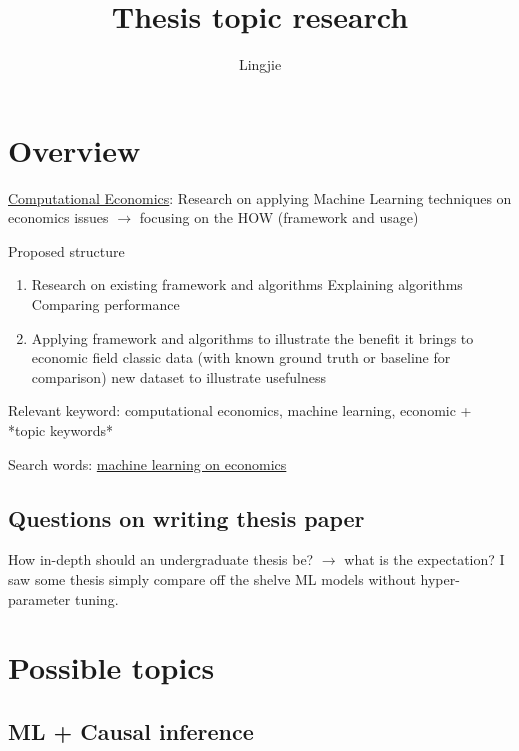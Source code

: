 \documentclass[11pt, oneside]{article}   	%
\title{Thesis topic research}
\author{Lingjie}
\begin{document}
\maketitle

\tableofcontents

\section{Overview}
    \href{https://www.springer.com/journal/10614}{Computational Economics}: 
    Research on applying Machine Learning techniques on economics issues 
    $\rightarrow$ focusing on the HOW (framework and usage)

    Proposed structure
    \begin{enumerate}
        \item Research on existing framework and algorithms
            \subitem[1.1] Explaining algorithms
            \subitem[1.2] Comparing performance
        \item Applying framework and algorithms to illustrate the benefit it brings to economic field
            \subitem[2.1] classic data (with known ground truth or baseline for comparison)
            \subitem[2.2] new dataset to illustrate usefulness
    \end{enumerate}

    Relevant keyword: computational economics, machine learning, economic + *topic keywords*

    Search words:
    \href{https://scholar.google.com.sg/scholar?q=
    machine+learning+on+economics&hl=en&as_sdt=0&as_vis=1&oi=scholart}{machine learning on economics}

    \subsection{Questions on writing thesis paper}

    How in-depth should an undergraduate thesis be? $\rightarrow$ what is the expectation?
    I saw some thesis simply compare off the shelve ML models without hyper-parameter tuning.

\section{Possible topics}

    \subsection{ML + Causal inference}
\end{document}
